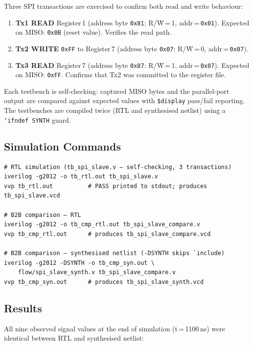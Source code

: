 \documentclass[11pt]{article}
\begin{document}
Three SPI transactions are exercised to confirm both read and write behaviour:
\begin{enumerate}
  \item \textbf{Tx1 READ} Register\,1 (address byte \texttt{0x81}: R/\=W\,=\,1, addr\,=\,\texttt{0x01}). Expected on MISO: \texttt{0x0B} (reset value). Verifies the read path.
  \item \textbf{Tx2 WRITE} \texttt{0xFF} to Register\,7 (address byte \texttt{0x07}: R/\=W\,=\,0, addr\,=\,\texttt{0x07}).
  \item \textbf{Tx3 READ} Register\,7 (address byte \texttt{0x87}: R/\=W\,=\,1, addr\,=\,\texttt{0x07}). Expected on MISO: \texttt{0xFF}. Confirms that Tx2 was committed to the register file.
\end{enumerate}

Each testbench is self-checking: captured MISO bytes and the parallel-port output are compared against expected values with \texttt{\$display} pass/fail reporting. The testbenches are compiled twice (RTL and synthesised netlist) using a \texttt{`ifndef SYNTH} guard.

\subsection{Simulation Commands}
\begin{lstlisting}
# RTL simulation (tb_spi_slave.v — self-checking, 3 transactions)
iverilog -g2012 -o tb_rtl.out tb_spi_slave.v
vvp tb_rtl.out          # PASS printed to stdout; produces tb_spi_slave.vcd

# B2B comparison — RTL
iverilog -g2012 -o tb_cmp_rtl.out tb_spi_slave_compare.v
vvp tb_cmp_rtl.out      # produces tb_spi_slave_compare.vcd

# B2B comparison — synthesised netlist (-DSYNTH skips `include)
iverilog -g2012 -DSYNTH -o tb_cmp_syn.out \
    flow/spi_slave_synth.v tb_spi_slave_compare.v
vvp tb_cmp_syn.out      # produces tb_spi_slave_synth.vcd
\end{lstlisting}

\subsection{Results}

All nine observed signal values at the end of simulation (t\,=\,1100\,ns) were identical between RTL and synthesised netlist:
\end{document}
